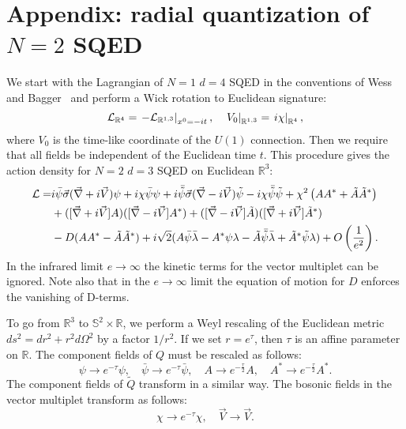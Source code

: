 \documentclass[a4paper,12pt, amsfonts, amssymb]{article}
\newcommand{\RR}{{\mathbb R}}
\renewcommand{\SS}{{\mathbb S}}
\newcommand{\ra}{\rightarrow}
\newcommand{\tQ}{{\tilde Q}}
\begin{document}
\section{Appendix: radial quantization of $N=2$ SQED}

We start with the Lagrangian of $N=1$ $d=4$ SQED in the conventions
of Wess and Bagger~\cite{WB} and perform a Wick rotation to Euclidean
signature:
$$
{\cal L}_{\RR^4}=\left.-{\cal L}_{\RR^{1,3}}\right|_{x^0=-it}, \quad \left.V_0\right|_{\RR^{1,3}}= \left.i\chi\right|_{\RR^4},
$$
where $V_0$ is the time-like coordinate of the $U(1)$ connection.
Then we require that all fields be independent of the Euclidean
time $t$. This procedure gives the action density for
$N=2$ $d=3$ SQED on Euclidean $\RR^3$:
\begin{align*}
{\cal L}=&i\bar{\psi}\vec{\sigma}(\vec{\nabla}+i\vec{V})\psi+i\chi\bar{\psi}
\psi+
i\bar{\tilde{\psi}}\vec{\sigma}(\vec{\nabla}-i\vec{V})\tilde{\psi}-i\chi\bar{
\tilde{\psi}}\tilde{\psi}+\chi^2\left(AA^*+\tilde{A}\tilde{A}^*\right)\\
&+([\vec{\nabla}+i\vec{V}]A)([\vec{\nabla}-i\vec{V}]A^*)+
([\vec{\nabla}-i\vec{V}]\tilde{A})([\vec{\nabla}+i\vec{V}]\tilde{A}^*)\\
&-D(AA^*-\tilde{A}\tilde{A}^*)
+i\sqrt{2}(A\bar{\psi}\bar{\lambda}-A^*\psi\lambda-
\tilde{A}\bar{\tilde{\psi}}\bar{\lambda}+\tilde{A}^*\tilde{\psi}\lambda)+
O\left(\frac{1}{e^2}\right).
\end{align*}
In the infrared limit $e\to\infty$ the kinetic terms for the vector multiplet
can be ignored. Note also that in the $e\ra\infty$ limit the equation of
motion for $D$ enforces the vanishing of D-terms.

To go from $\RR^3$ to $\SS^2\times \RR$, we perform
a Weyl rescaling of the Euclidean metric $ds^2=dr^2+r^2 d\Omega^2$ by a 
factor $1/r^2$. If we set $r=e^\tau$, then $\tau$ is
an affine parameter on $\RR$. The component fields of $Q$ must be rescaled 
as follows:
$$
\psi\ra e^{-\tau}\psi,\quad \bar{\psi}\ra e^{-\tau}\bar{\psi}, \quad
A\ra e^{-\frac{\tau}{2}}A,\quad A^*\ra e^{-\frac{\tau}{2}}A^*.
$$
The component fields of $\tQ$ transform in a similar way. 
The bosonic fields in the vector multiplet transform as follows:
$$
\chi \to e^{-\tau}\chi,\quad \vec{V}\to\vec{V}.
$$
\end{document}
